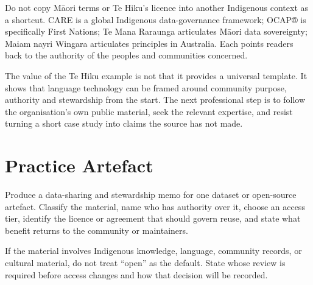 Do not copy Māori terms or Te Hiku's licence into another Indigenous context as a shortcut. CARE is a global Indigenous data-governance framework; OCAP® is specifically First Nations; Te Mana Raraunga articulates Māori data sovereignty; Maiam nayri Wingara articulates principles in Australia. Each points readers back to the authority of the peoples and communities concerned. \autocite{care,ocap,te-mana-raraunga,mnw-principles}


The value of the Te Hiku example is not that it provides a universal template. It shows that language technology can be framed around community purpose, authority and stewardship from the start. The next professional step is to follow the organisation's own public material, seek the relevant expertise, and resist turning a short case study into claims the source has not made.

\section{Practice Artefact}

Produce a data-sharing and stewardship memo for one dataset or open-source artefact. Classify the material, name who has authority over it, choose an access tier, identify the licence or agreement that should govern reuse, and state what benefit returns to the community or maintainers.


If the material involves Indigenous knowledge, language, community records, or cultural material, do not treat ``open'' as the default. State whose review is required before access changes and how that decision will be recorded.
